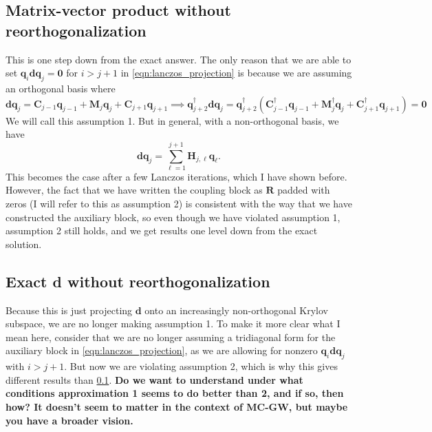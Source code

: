 \subsection{Matrix-vector product without reorthogonalization}
\label{sec:matrix_vector_product_without_reorthogonalization}
This is one step down from the exact answer. The only reason that we are able to set $\bm{q}_i\bm{d}\bm{q}_j = \bm{0}$ for $i>j+1$ in \ref{eqn:lanczos_projection} is because we are assuming an orthogonal basis where
\begin{equation}
    \bm{d}\bm{q}_j = \bm{C}_{j-1}\bm{q}_{j-1} + \bm{M}_j\bm{q}_j + \bm{C}_{j+1}\bm{q}_{j+1} \implies \bm{q}_{j+2}^{\dagger}\bm{d}\bm{q}_{j} = \bm{q}_{j+2}^{\dagger}\left( \bm{C}_{j-1}^{\dagger}\bm{q}_{j-1} + \bm{M}_j^{\dagger}\bm{q}_j + \bm{C}_{j+1}^{\dagger}\bm{q}_{j+1} \right) = \bm{0}
    \label{eqn:recurrence_ortho}
\end{equation}
We will call this assumption 1.
But in general, with a non-orthogonal basis, we have
\begin{equation}
    \bm{d}\bm{q}_j = \sum_{\ell=1}^{j+1} \bm {H}_{j,\ell}\bm{q}_\ell .
    \label{eqn:recurrence_general}
\end{equation}
This becomes the case after a few Lanczos iterations, which I have shown before. However, the fact that we have written the coupling block as $\bm{R}$ padded with zeros (I will refer to this as assumption 2) is consistent with the way that we have constructed the auxiliary block, so even though we have violated assumption 1, assumption 2 still holds, and we get results one level down from the exact solution.
\subsection{Exact d without reorthogonalization}
\label{sec:exact_d_without_reorthogonalization}
Because this is just projecting $\bm{d}$ onto an increasingly non-orthogonal Krylov subspace, we are no longer making assumption 1. To make it more clear what I mean here, consider that we are no longer assuming a tridiagonal form for the auxiliary block in \ref{eqn:lanczos_projection}, as we are allowing for nonzero $\bm{q}_{i}\bm{d}\bm{q}_j$ with $i>j+1$. But now we are violating assumption 2, which is why this gives different results than \ref{sec:matrix_vector_product_without_reorthogonalization}. \textbf{Do we want to understand under what conditions approximation 1 seems to do better than 2, and if so, then how? It doesn't seem to matter in the context of MC-GW, but maybe you have a broader vision.}
